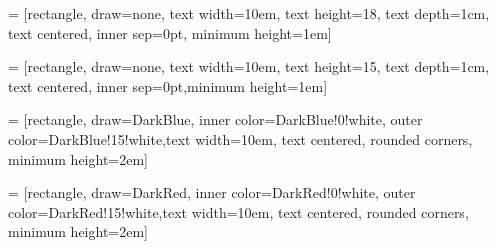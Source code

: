 



% 
 = [rectangle, draw=none, text width=10em, text
height=18, text depth=1cm, text centered, inner sep=0pt, minimum
height=1em]

 = [rectangle, draw=none, text width=10em, text
height=15, text depth=1cm, text centered, inner sep=0pt,minimum
height=1em]

 = [rectangle, draw=DarkBlue, inner
color=DarkBlue!0!white, outer color=DarkBlue!15!white,text width=10em, text centered,
rounded corners, minimum height=2em]

 = [rectangle, draw=DarkRed, inner
color=DarkRed!0!white, outer color=DarkRed!15!white,text width=10em, text centered,
rounded corners, minimum height=2em]

